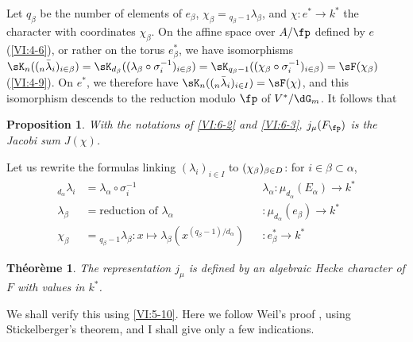 \documentclass[oneside]{book}
\newcounter{char}
\theoremstyle{sga-source}
\theoremstyle{sga-source-dash}
\theoremstyle{sga-source-dotdash}
\theoremstyle{sga-source-number-note-dash}
\theoremstyle{sga-source-note-number-dotdash}
\theoremstyle{sga-source-example-dotdash}
\theoremstyle{sga-source-inline-number}
\theoremstyle{sga-source-bare-number}
\theoremstyle{sga-source}
\newtheorem{theorem_}[subsection]{Théorème}
\newtheorem{proposition_}[subsection]{Proposition}
\begin{document}
Let $q_\beta$ be the number of elements of $e_\beta$, 
  $\chi_\beta={}_{q_\beta-1}\lambda_\beta$, and 
$\chi:e^\ast \to k^\ast$ the character with coordinates $\chi_\beta$. On the 
affine space over $A/\fp$ defined by $e$ (\ref{VI:4-6}), or rather on the torus 
$e_\beta^\ast$, we have isomorphisms 
  $\sK_n((_n\bar\lambda_i)_{i\in\beta}) = \sK_{d_\beta}((\lambda_\beta \circ \sigma_i^{-1})_{i\in\beta}) =\sK_{q_\beta-1}(\var{(\chi_\beta\circ \sigma_i^{-1})_{i\in I}}{(\chi_\beta\circ \sigma_i^{-1})_{i\in\beta}}{S45-SOL-0903}) = \sF(\chi_\beta)$ (\ref{VI:4-9}). 
  On $e^\ast$, we therefore have $\var{\sK_n((_n\bar\lambda_i)_{i\in \beta}) = \sF(\chi)}{\sK_n((_n\bar\lambda_i)_{i\in I}) = \sF(\chi)}{S45-SOL-0904}$, 
and this isomorphism descends to the reduction modulo $\fp$ of $V^\ast/\dG_m$. 
It follows that





\begin{proposition_}\label{VI:6-4}
With the notations of \ref{VI:6-2} and \ref{VI:6-3}, $j_\mu(F_\fp)$ is the 
Jacobi sum $J(\chi)$. 
\end{proposition_}

Let us rewrite the formulas linking $(\lambda_i)_{i\in I}$ to 
  $\var{(\chi_\beta)_{\beta\in B}}{(\chi_\beta)_{\beta\in D}}{S45-SOL-0906}$: for $i\in \beta\subset \alpha$, 
\begin{align*}
  _{d_\alpha} \lambda_i &= \lambda_\alpha\circ \sigma_i^{-1} && \lambda_\alpha:\mu_{d_\alpha}(E_\alpha) \to k^\ast \\
  \lambda_\beta &= \text{reduction of $\lambda_\alpha$} && :\mu_{d_\alpha}(e_\beta) \to k^\ast \\
  \chi_\beta &= {}_{q_\beta-1}\lambda_\beta: x\mapsto \lambda_\beta(x^{(q_\beta-1)/d_\alpha}) && :e_\beta^\ast \to k^\ast 
\end{align*}





\begin{theorem_}\label{VI:6-5}
The representation $j_\mu$ is defined by an algebraic Hecke character 
of $F$ with values in $k^\ast$. 
\end{theorem_}

We shall verify this using \ref{VI:5-10}. Here we follow Weil's 
proof \cite{we52,we74-2}, using Stickelberger's theorem, 
and I shall give only a few indications. 
\end{document}
